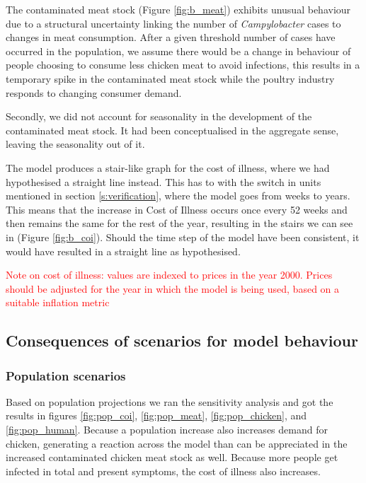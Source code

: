 The contaminated meat stock (Figure \ref{fig:b_meat}) exhibits unusual behaviour due to a structural uncertainty linking the number of \textit{Campylobacter} cases to changes in meat consumption. After a given threshold number of cases have occurred in the population, we assume there would be a change in behaviour of people choosing to consume less chicken meat to avoid infections, this results in a temporary spike in the contaminated meat stock while the poultry industry responds to changing consumer demand.

Secondly, we did not account for seasonality in the development of the contaminated meat stock. It had been conceptualised in the aggregate sense, leaving the seasonality out of it. 

The model produces a stair-like graph for the cost of illness, where we had hypothesised a straight line instead. This has to with the switch in units mentioned in section \ref{s:verification}, where the model goes from weeks to years. This means that the increase in Cost of Illness occurs once every 52 weeks and then remains the same for the rest of the year, resulting in the stairs we can see in (Figure \ref{fig:b_coi}). Should the time step of the model have been consistent, it would have resulted in a straight line as hypothesised. 

\textcolor{red}{Note on cost of illness: values are indexed to prices in the year 2000. Prices should be adjusted for the year in which the model is being used, based on a suitable inflation metric}

\subsection{Consequences of scenarios for model behaviour}
\subsubsection{Population scenarios}

Based on population projections \parencite{nidi_nidi_2020} we ran the sensitivity analysis and got the results in figures \ref{fig:pop_coi}, \ref{fig:pop_meat}, \ref{fig:pop_chicken}, and \ref{fig:pop_human}. Because a population increase also increases demand for chicken, generating a reaction across the model than can be appreciated in the increased contaminated chicken meat stock as well. Because more people get infected in total and present symptoms, the cost of illness also increases.

